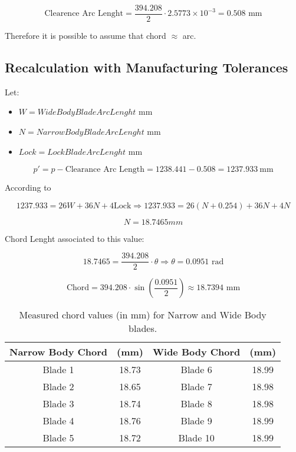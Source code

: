 \[
\text{Clearence Arc Lenght} = \frac{394.208}{2} \cdot 2.5773 \times 10^{-3} = 0.508 \text{ mm}
\]


Therefore it is possible to assume that chord $\approx$ arc.

\subsection*{Recalculation with Manufacturing Tolerances}

Let:
\begin{itemize}
    \item $W = Wide Body Blade Arc Lenght$ mm 
    \item $N = Narrow Body Blade Arc Lenght$ mm
    \item $Lock = Lock Blade Arc Lenght$ mm
\end{itemize}

\[
p' = p - \text{Clearance Arc Length} = 1238.441 - 0.508 = 1237.933~\text{mm}
\]


According to 

\[
1237.933 = 26W + 36N + 4 \text{Lock} \Rightarrow 1237.933 = 26(N + 0.254) + 36N + 4N
\]

\[
N = 18.7465mm
\]

Chord Lenght associated to this value:

\[
18.7465 = \frac{394.208}{2} \cdot \theta \Rightarrow \theta = 0.0951 \text{ rad}
\]

\[
\text{Chord} = 394.208 \cdot \sin\left(\frac{0.0951}{2}\right) \approx 18.7394 \text{ mm}
\]


\begin{table}[H]
    \centering
    \caption{Measured chord values (in mm) for Narrow and Wide Body blades.}
    \begin{tabular}{cccc}
        \hline
        \textbf{Narrow Body Chord} & \textbf{(mm)} & \textbf{Wide Body Chord} & \textbf{(mm)} \\ \hline
        Blade 1 & 18.73 & Blade 6 & 18.99 \\
        Blade 2 & 18.65 & Blade 7 & 18.98 \\
        Blade 3 & 18.74 & Blade 8 & 18.98 \\
        Blade 4 & 18.76 & Blade 9 & 18.99 \\
        Blade 5 & 18.72 & Blade 10 & 18.99 \\ \hline
    \end{tabular}
\end{table}